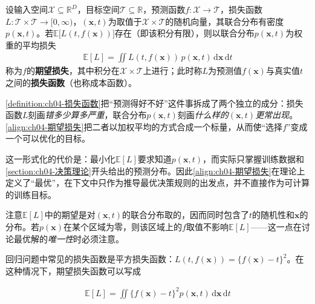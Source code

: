 \documentclass[../../main.tex]{subfiles}
\begin{document}
\begin{definition}[损失函数与期望损失]\label{definition:ch04-损失函数}
设输入空间$\mathcal{X}\subseteq\mathbb{R}^{D}$，目标空间$\mathcal{T}\subseteq\mathbb{R}$，预测函数$f:\mathcal{X}\to\mathcal{T}$，损失函数$L:\mathcal{T}\times\mathcal{T}\to[0,\infty)$，$(\boldsymbol{x},t)$为取值于$\mathcal{X}\times\mathcal{T}$的随机向量，其联合分布有密度$p(\boldsymbol{x},t)$。若$\mathbb{E}\bigl[L(t,f(\boldsymbol{x}))\bigr]$存在（即该积分有限），则以联合分布$p(\boldsymbol{x},t)$为权重的平均损失
\begin{align}
  \mathbb{E}[L]=\iint L(t,f(\boldsymbol{x}))\,p(\boldsymbol{x},t)\,\mathrm{d}\boldsymbol{x}\,\mathrm{d}t
  \label{align:ch04-期望损失}
\end{align}
称为$f$的\textbf{期望损失}，其中积分在$\mathcal{X}\times\mathcal{T}$上进行；此时称$L$为预测值$f(\boldsymbol{x})$与真实值$t$之间的\textbf{损失函数}（也称成本函数）。
\end{definition}

\begin{remark}
\cref{definition:ch04-损失函数}把“预测得好不好”这件事拆成了两个独立的成分：损失函数$L$刻画\emph{错多少算多严重}，联合分布$p(\boldsymbol{x},t)$刻画\emph{什么样的$({\boldsymbol{x}},t)$更常出现}。\eqref{align:ch04-期望损失}把二者以加权平均的方式合成一个标量，从而使“选择$f$”变成一个可以优化的目标。

这一形式化的代价是：最小化$\mathbb{E}[L]$要求知道$p(\boldsymbol{x},t)$，而实际只掌握训练数据和\cref{section:ch04-决策理论}开头给出的预测分布。因此\eqref{align:ch04-期望损失}在理论上定义了“最优”，在下文中只作为推导最优决策规则的出发点，并不直接作为可计算的训练目标。

注意$\mathbb{E}[L]$中的期望是对$({\boldsymbol{x}},t)$的联合分布取的，因而同时包含了$t$的随机性和$\boldsymbol{x}$的分布。若$p(\boldsymbol{x})$在某个区域为零，则该区域上的$f$取值不影响$\mathbb{E}[L]$——这一点在讨论最优解的\emph{唯一性}时必须注意。
\end{remark}

回归问题中常见的损失函数是平方损失函数：$L(t,f(\boldsymbol{x}))=\{f(\boldsymbol{x})-t\}^2$。在这种情况下，期望损失函数可以写成

\begin{align}
  \mathbb{E}[L]=\iint\{f(\boldsymbol{x})-t\}^2p(\boldsymbol{x},t)\,\mathrm{d}\boldsymbol{x}\,\mathrm{d}t
  \label{align:ch04-平方损失期望}
\end{align}
\end{document}

